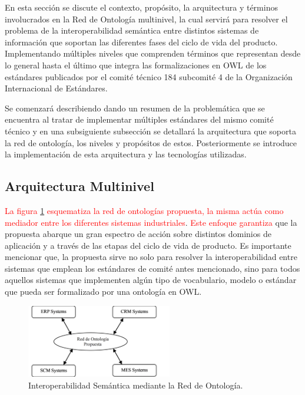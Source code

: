 \documentclass[journal]{IEEEtran}
\begin{document}
En esta secci\'on se discute el contexto, prop\'osito, la arquitectura y t\'erminos involucrados en la Red de Ontolog\'ia multinivel, la cual servir\'a para resolver el problema de la interoperabilidad sem\'antica entre distintos sistemas de informaci\'on que soportan las diferentes fases del ciclo de vida del producto. Implementando m\'ultiples niveles que comprenden t\'erminos que representan desde lo general hasta el \'ultimo que integra las formalizaciones en OWL de los est\'andares publicados por el comit\'e t\'ecnico 184 subcomit\'e 4 de la Organizaci\'on Internacional de Est\'andares. 

Se comenzar\'a describiendo dando un resumen de la problem\'atica que se encuentra al tratar de implementar m\'ultiples est\'andares del mismo comit\'e t\'ecnico y en una subsiguiente subsecci\'on se detallar\'a la arquitectura que soporta la red de ontolog\'ia, los niveles y prop\'ositos de estos. Posteriormente se introduce la implementaci\'on de esta arquitectura y las tecnolog\'ias utilizadas.


\subsection{Arquitectura Multinivel}

\textcolor{red}{La figura \ref{fig1} esquematiza la red de ontolog\'ias propuesta, la misma act\'ua como mediador entre los diferentes sistemas industriales}. \textcolor{red}{Este enfoque garantiza} que la propuesta abarque un gran espectro de acci\'on sobre distintos dominios de aplicaci\'on y a trav\'es de las etapas del ciclo de vida de producto. Es importante mencionar que, la propuesta sirve no solo para resolver la interoperabilidad entre sistemas que emplean los est\'andares de comit\'e antes mencionado, sino para todos aquellos sistemas que implementen alg\'un tipo de vocabulario, modelo o est\'andar que pueda ser formalizado por una ontolog\'ia en OWL. 

\begin{figure}[!t]
\centering
\includegraphics[width=2.5in]{figures/figure1.png}
\caption{Interoperabilidad Sem\'antica mediante la Red de Ontolog\'ia.}
\label{fig1}
\end{figure}
\end{document}
